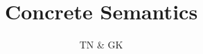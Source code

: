 \documentclass[11pt,a4paper]{article}
\begin{document}
\title{Concrete Semantics}
\author{TN \& GK}
\maketitle

\tableofcontents
\newpage



\nocite{Nipkow}



\end{document}
